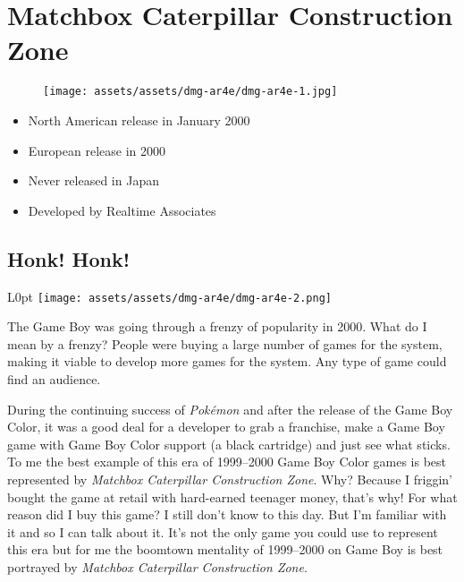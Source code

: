 \documentclass{book}
\begin{document}
\begingroup \chapter*{Matchbox Caterpillar Construction Zone} \endgroup
\begin{figure}[H]
\vskip 4pt
\centering
\texttt{[image: assets/assets/dmg-ar4e/dmg-ar4e-1.jpg]}\end{figure}
\begin{itemize} [nosep]




\item North American release in January 2000







\item European release in 2000








\item Never released in Japan





\item Developed by Realtime Associates

\end{itemize}\noindent

\newpage\FloatBarrier\needspace{10mm}\section*{Honk! Honk!}\nopagebreak[4]
\begin{wrapfigure}{L}{0pt} \texttt{[image: assets/assets/dmg-ar4e/dmg-ar4e-2.png]}\end{wrapfigure}
The Game Boy was going through a frenzy of popularity in 2000. What do I mean by a frenzy? People were buying a large number of games for the system, making it viable to develop more games for the system. Any type of game could find an audience.

During the continuing success of \emph{Pokémon} and after the release of the Game Boy Color, it was a good deal for a developer to grab a franchise, make a Game Boy game with Game Boy Color support (a black cartridge) and just see what sticks. To me the best example of this era of 1999–2000 Game Boy Color games is best represented by \emph{Matchbox Caterpillar Construction Zone}. Why? Because I friggin’ bought the game at retail with hard-earned teenager money, that’s why! For what reason did I buy this game? I still don’t know to this day. But I’m familiar with it and so I can talk about it. It’s not the only game you could use to represent this era but for me the boomtown mentality of 1999–2000 on Game Boy is best portrayed by \emph{Matchbox Caterpillar Construction Zone}.
\end{document}
